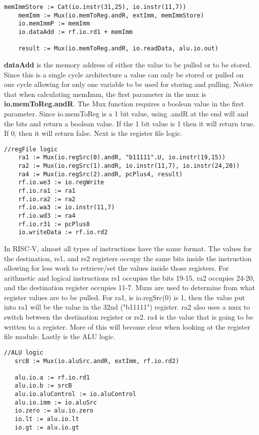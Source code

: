 \documentclass[12pt, letterpaper]{report}
\begin{document}
\begin{lstlisting}[style=scala]
    memImmStore := Cat(io.instr(31,25), io.instr(11,7))
    memImm := Mux(io.memToReg.andR, extImm, memImmStore)
    io.memImmP := memImm
    io.dataAdd := rf.io.rd1 + memImm
    
    result := Mux(io.memToReg.andR, io.readData, alu.io.out)
\end{lstlisting}

\textbf{dataAdd} is the memory address of either the value to be pulled or to be stored. Since this is a single
cycle architecture a value can only be stored or pulled on one cycle allowing for only one variable to be used for
storing and pulling. Notice that when calculating memImm, the first parameter in the mux is 
\textbf{io.memToReg.andR}. The Mux function requires a boolean value in the first parameter. Since io.memToReg is
a 1 bit value, using .andR at the end will and the bits and return a boolean value. If the 1 bit value is 1 then 
it will return true. If 0, then it will return false. Next is the register file logic.

\begin{lstlisting}[style=scala]
    //regFile logic
    ra1 := Mux(io.regSrc(0).andR, "b11111".U, io.instr(19,15))
    ra2 := Mux(io.regSrc(1).andR, io.instr(11,7), io.instr(24,20))
    ra4 := Mux(io.regSrc(2).andR, pcPlus4, result)
    rf.io.we3 := io.regWrite
    rf.io.ra1 := ra1
    rf.io.ra2 := ra2
    rf.io.wa3 := io.instr(11,7)
    rf.io.wd3 := ra4
    rf.io.r31 := pcPlus8
    io.writeData := rf.io.rd2
\end{lstlisting}

In RISC-V, almost all types of instructions have the same format. The values for the destination, rs1, and rs2 registers occupy the same
bits inside the instruction allowing for less work to retrieve/set the values inside those registers. For arithmetic and logical instructions
rs1 occupies the bits 19-15, ra2 occupies 24-20, and the destination register occupies 11-7. Muxs are used to determine from what register values
are to be pulled. For ra1, is io.regSrc(0) is 1, then the value put into ra1 will be the value in the 32nd ("b11111") register. ra2 also uses a mux
to switch between the destination register or rs2. ra4 is the value that is going to be written to a register. More of this will become clear when
looking at the register file module. Lastly is the ALU logic. 

\begin{lstlisting}[style=scala]
   //ALU logic
   srcB := Mux(io.aluSrc.andR, extImm, rf.io.rd2)

   alu.io.a := rf.io.rd1
   alu.io.b := srcB
   alu.io.aluControl := io.aluControl
   alu.io.imm := io.aluSrc
   io.zero := alu.io.zero
   io.lt := alu.io.lt
   io.gt := alu.io.gt
\end{lstlisting}
\end{document}

